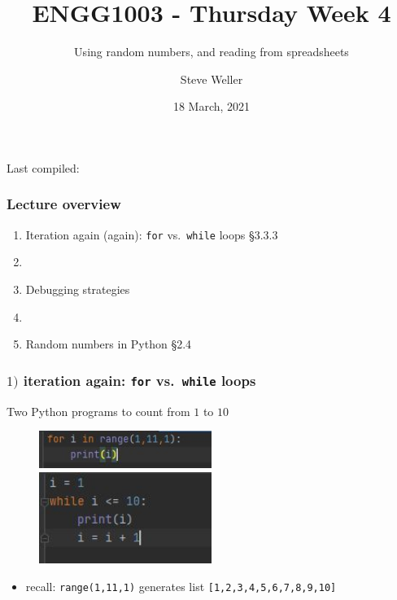 \documentclass[english,14pt]{beamer}
\title{ENGG1003 - Thursday Week 4}
\subtitle{Using random numbers, and reading from spreadsheets}
\author{Steve Weller}
\institute{University of Newcastle}
\date{18 March, 2021}
\newcommand\red[1]{{\color{red} #1}}
\begin{document}
\begin{flushleft}
{\scriptsize Last compiled:~\DTMnow}
\vspace*{-5mm}
\end{flushleft}
\framebreak


\begin{frame}[fragile]

\frametitle{Lecture overview}
\begin{enumerate}
	\item Iteration again (again): \texttt{for} vs.~\texttt{while} loops \red{\S3.3.3}

	\item[]
	
	\item Debugging strategies
	
	\item[]
	
	\item Random numbers in Python \red{\S2.4}

\end{enumerate}

\end{frame}


\begin{frame}[fragile]

\frametitle{$1)$ iteration again: \texttt{for} vs.~\texttt{while} loops}

Two Python programs to count from $1$ to $10$

\begin{figure}[ht]
	\centering
	\includegraphics[width=0.5\textwidth]{figures/for1to10}%
	\hspace*{3mm}\includegraphics[width=0.5\textwidth]{figures/while1to10}
\end{figure}

\begin{itemize}
	\item recall: \texttt{range(1,11,1)} generates list \texttt{[1,2,3,4,5,6,7,8,9,10]} 
\end{itemize}

\end{frame}
\end{document}
